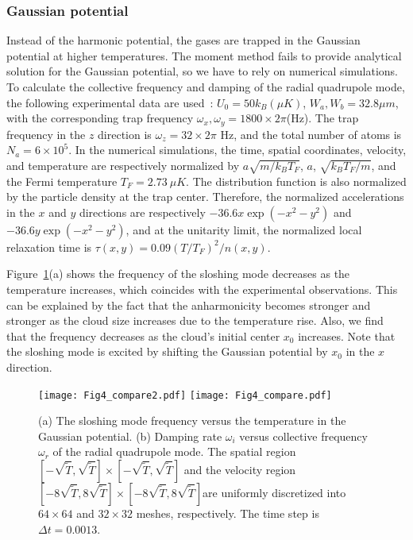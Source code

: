 \subsubsection{Gaussian potential}

Instead of the harmonic potential, the gases are trapped in the Gaussian potential at higher temperatures. The moment method fails to provide analytical solution for the Gaussian potential, so we have to rely on numerical simulations. To calculate the collective frequency and damping of the radial quadrupole mode, the following experimental data are used~\cite{Riedl2008}: $U_0=50k_B(\mu K)$, $W_a,W_b=32.8\mu{m}$, with the corresponding trap frequency $\omega_x,\omega_y=1800\times2\pi$(Hz). The trap frequency in the $z$ direction is $\omega_z=32\times2\pi$ Hz, and the total number of atoms is $N_a=6\times10^5$. In the numerical simulations, the time, spatial coordinates, velocity, and temperature are respectively normalized by $a\sqrt{m/k_BT_F}$, $a$, $\sqrt{k_BT_F/m}$, and the Fermi temperature $T_F=2.73~\mu K$. The distribution function is also normalized by the particle density at the trap center. Therefore, the normalized accelerations in the $x$ and $y$ directions are respectively $-36.6x\exp(-x^2-y^2)$ and $-36.6y\exp(-x^2-y^2)$, and at the unitarity limit, the normalized local relaxation time is $\tau(x,y)=0.09(T/T_F)^2/n(x,y)$.


Figure~\ref{gauss}(a) shows the frequency of the sloshing mode decreases as the temperature increases, which coincides with the experimental observations. This can be explained by the fact that the anharmonicity becomes stronger and stronger as the cloud size increases due to the temperature rise. Also, we find that the frequency decreases as the cloud's initial center $x_0$ increases. Note that the sloshing mode is excited by shifting the Gaussian potential by $x_0$ in the $x$ direction.



\begin{figure}[t]
	\centering
	\texttt{[image: Fig4\_compare2.pdf]}
	\texttt{[image: Fig4\_compare.pdf]}
	\caption[(a) The sloshing mode frequency versus the temperature in the Gaussian potential. (b) Damping rate $\omega_i$ versus collective frequency $\omega_r$ of the radial quadrupole mode.]
	{(a) The sloshing mode frequency versus the temperature in the Gaussian potential. (b) Damping rate $\omega_i$ versus collective frequency $\omega_r$ of the radial quadrupole mode. The spatial region $[-\sqrt{\widetilde{T}},\sqrt{\widetilde{T}}]\times[-\sqrt{\widetilde{T}},\sqrt{\widetilde{T}}]$ and the velocity region $[-8\sqrt{\widetilde{T}},8\sqrt{\widetilde{T}}]\times[-8\sqrt{\widetilde{T}},8\sqrt{\widetilde{T}}]$are uniformly discretized into $64\times64$ and $32\times32$ meshes, respectively. The time step is $\Delta t=0.0013$.}
	\label{gauss}
\end{figure}


